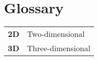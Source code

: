 %
\chapter*{Glossary}

\begin{table}[!hb]
    \begin{tabular}{ll}
        \textbf{2D} & Two-dimensional   \\
        \textbf{3D} & Three-dimensional \\
    \end{tabular}
\end{table}
